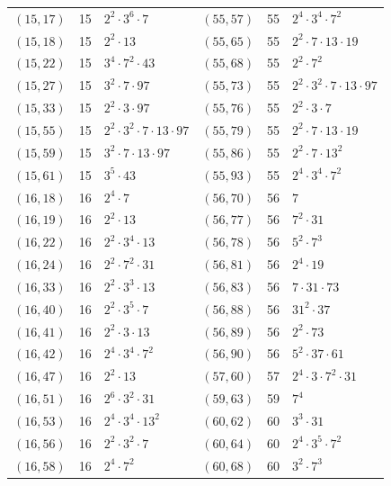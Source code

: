 \documentclass[11pt]{article}
\begin{document}
\begin{longtable}{@{}lrl@{\qquad}lrl@{}}
$(15,17)$ & 15 & $2^{2}\cdot 3^{6}\cdot 7$ & $(55,57)$ & 55 & $2^{4}\cdot 3^{4}\cdot 7^{2}$\\
$(15,18)$ & 15 & $2^{2}\cdot 13$ & $(55,65)$ & 55 & $2^{2}\cdot 7\cdot 13\cdot 19$\\
$(15,22)$ & 15 & $3^{4}\cdot 7^{2}\cdot 43$ & $(55,68)$ & 55 & $2^{2}\cdot 7^{2}$\\
$(15,27)$ & 15 & $3^{2}\cdot 7\cdot 97$ & $(55,73)$ & 55 & $2^{2}\cdot 3^{2}\cdot 7\cdot 13\cdot 97$\\
$(15,33)$ & 15 & $2^{2}\cdot 3\cdot 97$ & $(55,76)$ & 55 & $2^{2}\cdot 3\cdot 7$\\
$(15,55)$ & 15 & $2^{2}\cdot 3^{2}\cdot 7\cdot 13\cdot 97$ & $(55,79)$ & 55 & $2^{2}\cdot 7\cdot 13\cdot 19$\\
$(15,59)$ & 15 & $3^{2}\cdot 7\cdot 13\cdot 97$ & $(55,86)$ & 55 & $2^{2}\cdot 7\cdot 13^{2}$\\
$(15,61)$ & 15 & $3^{5}\cdot 43$ & $(55,93)$ & 55 & $2^{4}\cdot 3^{4}\cdot 7^{2}$\\
$(16,18)$ & 16 & $2^{4}\cdot 7$ & $(56,70)$ & 56 & $7$\\
$(16,19)$ & 16 & $2^{2}\cdot 13$ & $(56,77)$ & 56 & $7^{2}\cdot 31$\\
$(16,22)$ & 16 & $2^{2}\cdot 3^{4}\cdot 13$ & $(56,78)$ & 56 & $5^{2}\cdot 7^{3}$\\
$(16,24)$ & 16 & $2^{2}\cdot 7^{2}\cdot 31$ & $(56,81)$ & 56 & $2^{4}\cdot 19$\\
$(16,33)$ & 16 & $2^{2}\cdot 3^{3}\cdot 13$ & $(56,83)$ & 56 & $7\cdot 31\cdot 73$\\
$(16,40)$ & 16 & $2^{2}\cdot 3^{5}\cdot 7$ & $(56,88)$ & 56 & $31^{2}\cdot 37$\\
$(16,41)$ & 16 & $2^{2}\cdot 3\cdot 13$ & $(56,89)$ & 56 & $2^{2}\cdot 73$\\
$(16,42)$ & 16 & $2^{4}\cdot 3^{4}\cdot 7^{2}$ & $(56,90)$ & 56 & $5^{2}\cdot 37\cdot 61$\\
$(16,47)$ & 16 & $2^{2}\cdot 13$ & $(57,60)$ & 57 & $2^{4}\cdot 3\cdot 7^{2}\cdot 31$\\
$(16,51)$ & 16 & $2^{6}\cdot 3^{2}\cdot 31$ & $(59,63)$ & 59 & $7^{4}$\\
$(16,53)$ & 16 & $2^{4}\cdot 3^{4}\cdot 13^{2}$ & $(60,62)$ & 60 & $3^{3}\cdot 31$\\
$(16,56)$ & 16 & $2^{2}\cdot 3^{2}\cdot 7$ & $(60,64)$ & 60 & $2^{4}\cdot 3^{5}\cdot 7^{2}$\\
$(16,58)$ & 16 & $2^{4}\cdot 7^{2}$ & $(60,68)$ & 60 & $3^{2}\cdot 7^{3}$\\

\end{longtable}
\end{document}
